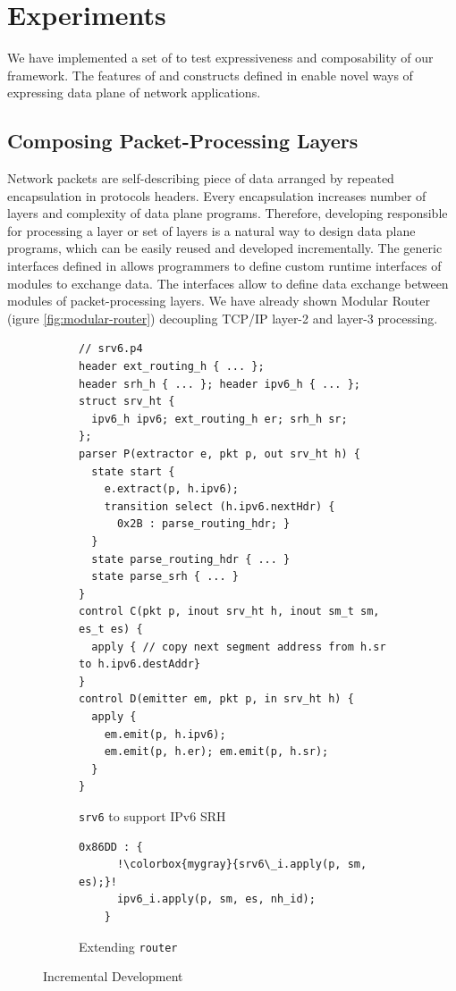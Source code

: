 \documentclass[letterpaper,twocolumn,10pt]{article}
\begin{document}
\section{Experiments}
We have implemented a set of \uprograms to test expressiveness and composability of our framework.
The features of \ulang and constructs defined in \uarch enable novel ways of expressing data plane of network applications.

\subsection{Composing Packet-Processing Layers}
Network packets are self-describing piece of data arranged by repeated encapsulation in protocols headers.
Every encapsulation increases number of layers and complexity of data plane programs.
Therefore, developing \uprograms responsible for processing a layer or set of layers is a natural way to design data plane programs, which can be easily reused and developed incrementally.
The generic interfaces defined in \uarch allows programmers to define custom runtime interfaces of modules to exchange data.
The interfaces allow to define data exchange between \ulang modules of packet-processing layers.
We have already shown Modular Router (igure \ref{fig:modular-router}) decoupling TCP/IP layer-2 and layer-3 processing.
\begin{figure}[!h]
\begin{subfigure}[b]{\linewidth}
 \begin{lstlisting}[frame=none]
// srv6.p4
header ext_routing_h { ... }; 
header srh_h { ... }; header ipv6_h { ... }; 
struct srv_ht { 
  ipv6_h ipv6; ext_routing_h er; srh_h sr;
};
parser P(extractor e, pkt p, out srv_ht h) {
  state start {
    e.extract(p, h.ipv6);
    transition select (h.ipv6.nextHdr) {
      0x2B : parse_routing_hdr; }
  }
  state parse_routing_hdr { ... }
  state parse_srh { ... }
}
control C(pkt p, inout srv_ht h, inout sm_t sm, es_t es) {
  apply { // copy next segment address from h.sr to h.ipv6.destAddr}
}
control D(emitter em, pkt p, in srv_ht h) {
  apply { 
    em.emit(p, h.ipv6);
    em.emit(p, h.er); em.emit(p, h.sr);
  }
}
\end{lstlisting}
\caption{\texttt{srv6} \uprogram to support IPv6 SRH\cite{srh}}
\label{subfig:srv6}
\end{subfigure}
\begin{subfigure}[b]{\linewidth}
 \begin{lstlisting}[frame=none, escapechar=!]
    0x86DD : { 
      !\colorbox{mygray}{srv6\_i.apply(p, sm, es);}!
      ipv6_i.apply(p, sm, es, nh_id);
    }
\end{lstlisting}
\caption{Extending \texttt{router} \uprogram}
\label{subfig:extending-modular-router}
\end{subfigure}
\caption{Incremental Development}
\label{fig:incremental-development}
\end{figure}
\end{document}
